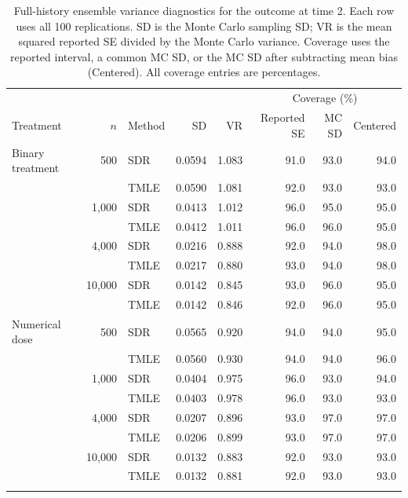 \begin{table}[!htbp]
\centering\small
\setlength{\tabcolsep}{4pt}
\caption{Full-history ensemble variance diagnostics for the outcome at time 2. Each row uses all 100 replications. SD is the Monte Carlo sampling SD; VR is the mean squared reported SE divided by the Monte Carlo variance. Coverage uses the reported interval, a common MC SD, or the MC SD after subtracting mean bias (Centered). All coverage entries are percentages.}
\label{tab:sim-fh-mc-1}
\begin{tabular}{lrl*{5}{r}}
\toprule
& & & & & \multicolumn{3}{c}{Coverage (\%)}\\
Treatment & $n$ & Method & SD & VR & Reported SE & MC SD & Centered\\
\midrule
Binary treatment & 500 & SDR & 0.0594 & 1.083 & 91.0 & 93.0 & 94.0\\
 &  & TMLE & 0.0590 & 1.081 & 92.0 & 93.0 & 93.0\\
\addlinespace[2pt]
 & 1,000 & SDR & 0.0413 & 1.012 & 96.0 & 95.0 & 95.0\\
 &  & TMLE & 0.0412 & 1.011 & 96.0 & 96.0 & 95.0\\
\addlinespace[2pt]
 & 4,000 & SDR & 0.0216 & 0.888 & 92.0 & 94.0 & 98.0\\
 &  & TMLE & 0.0217 & 0.880 & 93.0 & 94.0 & 98.0\\
\addlinespace[2pt]
 & 10,000 & SDR & 0.0142 & 0.845 & 93.0 & 96.0 & 95.0\\
 &  & TMLE & 0.0142 & 0.846 & 92.0 & 96.0 & 95.0\\
\addlinespace[2pt]
\midrule
Numerical dose & 500 & SDR & 0.0565 & 0.920 & 94.0 & 94.0 & 95.0\\
 &  & TMLE & 0.0560 & 0.930 & 94.0 & 94.0 & 96.0\\
\addlinespace[2pt]
 & 1,000 & SDR & 0.0404 & 0.975 & 96.0 & 93.0 & 94.0\\
 &  & TMLE & 0.0403 & 0.978 & 96.0 & 93.0 & 93.0\\
\addlinespace[2pt]
 & 4,000 & SDR & 0.0207 & 0.896 & 93.0 & 97.0 & 97.0\\
 &  & TMLE & 0.0206 & 0.899 & 93.0 & 97.0 & 97.0\\
\addlinespace[2pt]
 & 10,000 & SDR & 0.0132 & 0.883 & 92.0 & 93.0 & 93.0\\
 &  & TMLE & 0.0132 & 0.881 & 92.0 & 93.0 & 93.0\\
\addlinespace[2pt]
\bottomrule
\end{tabular}
\end{table}
